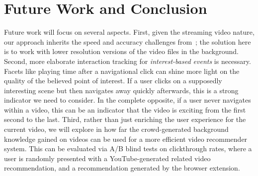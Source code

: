 \documentclass[runningheads,a4paper]{llncs}
\begin{document}

\section{Future Work and Conclusion} \label{sec:future-work-conclusion}

Future work will focus on several aspects. First, given the streaming video nature, our approach inherits the speed and accuracy challenges from~\cite{artemis}; the solution here is to work with lower resolution versions of the video files in the background. Second, more elaborate interaction tracking for \emph{interest-based events} is necessary. Facets like playing time after a navigational click can shine more light on the quality of the believed point of interest. If a user clicks on a supposedly interesting scene but then navigates away quickly afterwards, this is a strong indicator we need to consider. In the complete opposite, if a user never navigates within a video, this can be an indicator that the video is exciting from the first second to the last. Third, rather than just enriching the user experience for the current video, we will explore in how far the crowd-generated background knowledge gained on videos can be used for a more efficient video recommender system. This can be evaluated via A/B blind tests on clickthrough rates, where a user is randomly presented with a YouTube-generated related video recommendation, and a recommendation generated by the browser extension. 
\end{document}

